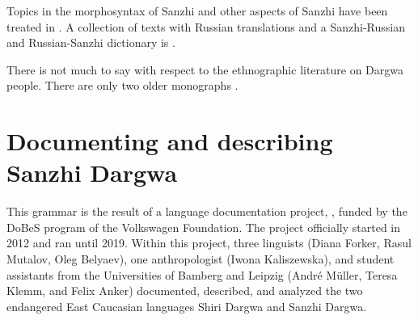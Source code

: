 Topics in the morphosyntax of Sanzhi and other aspects of Sanzhi have been treated in \citet{Forker2016a, Forker2014, Forker2019, ForkerSubmitteda, ForkerSubmittedb, ForkerSubmittedc}. A collection of texts with Russian translations and a Sanzhi-Russian and Russian-Sanzhi dictionary is \citet{Forker.Gadzhimuradov2017}.

There is not much to say with respect to the ethnographic literature on Dargwa people. There are only two older monographs \citep{Schilling1949, Gadzieva.etal1967}.



\section{Documenting and describing Sanzhi Dargwa}
\label{sec:Documenting and describing Sanzhi Dargwa}

This grammar is the result of a language documentation project, , funded by the DoBeS program of the Volkswagen Foundation. The project officially started in 2012 and ran until 2019. Within this project, three linguists (Diana Forker, Rasul Mutalov, Oleg Belyaev), one anthropologist (Iwona Kaliszewska), and student assistants from the Universities of Bamberg and Leipzig (André M{\"u}ller, Teresa Klemm, and Felix Anker) documented, described, and analyzed the two endangered East Caucasian languages Shiri Dargwa and Sanzhi Dargwa.

